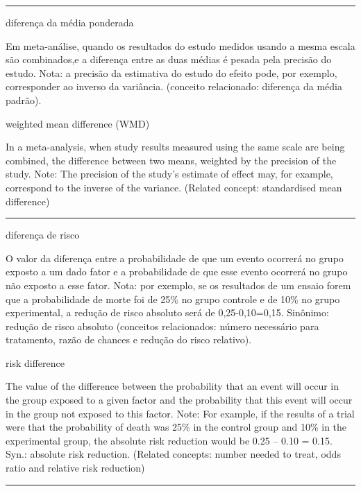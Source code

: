 \documentclass[
]{book}
\begin{document}
\begin{center}\rule{0.5\linewidth}{0.5pt}\end{center}

diferença da média ponderada

Em meta-análise, quando os resultados do estudo medidos usando a mesma escala são combinados,e a diferença entre as duas médias é pesada pela precisão do estudo. Nota: a precisão da estimativa do estudo do efeito pode, por exemplo, corresponder ao inverso da variância. (conceito relacionado: diferença da média padrão).

weighted mean difference (WMD)

In a meta-analysis, when study results measured using the same scale are being combined, the difference between two means, weighted by the precision of the study. Note: The precision of the study's estimate of effect may, for example, correspond to the inverse of the variance. (Related concept: standardised mean difference)

\begin{center}\rule{0.5\linewidth}{0.5pt}\end{center}

diferença de risco

O valor da diferença entre a probabilidade de que um evento ocorrerá no grupo exposto a um dado fator e a probabilidade de que esse evento ocorrerá no grupo não exposto a esse fator. Nota: por exemplo, se os resultados de um ensaio forem que a probabilidade de morte foi de 25\% no grupo controle e de 10\% no grupo experimental, a redução de risco absoluto será de 0,25-0,10=0,15. Sinônimo: redução de risco absoluto (conceitos relacionados: número necessário para tratamento, razão de chances e redução do risco relativo).

risk difference

The value of the difference between the probability that an event will occur in the group exposed to a given factor and the probability that this event will occur in the group not exposed to this factor. Note: For example, if the results of a trial were that the probability of death was 25\% in the control group and 10\% in the experimental group, the absolute risk reduction would be 0.25 -- 0.10 = 0.15. Syn.: absolute risk reduction. (Related concepts: number needed to treat, odds ratio and relative risk reduction)

\begin{center}\rule{0.5\linewidth}{0.5pt}\end{center}
\end{document}
